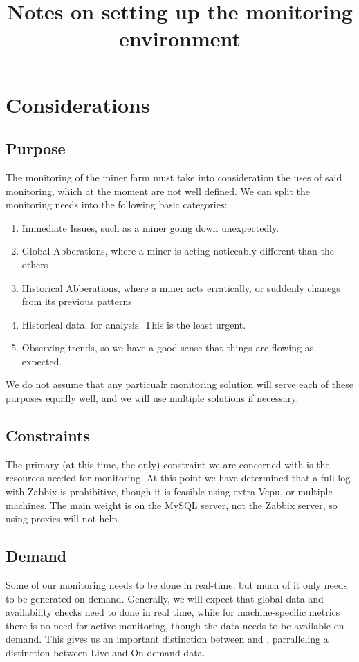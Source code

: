 \title{Notes on setting up the monitoring environment}
\section{Considerations}
\subsection{Purpose}
The monitoring of the miner farm must take into consideration the uses of said monitoring, which at the moment are not well defined. We can split the monitoring needs into the following basic categories:
\begin{enumerate}
	\item{Immediate Issues, such as a miner going down unexpectedly.}
	\item{Global Abberations, where a miner is acting noticeably different than the others}
	\item{Historical Abberations, where a miner acts erratically, or suddenly chanegs from its previous patterns}
	\item{Historical data, for analysis. This is the least urgent.}
	\item{Observing trends, so we have a good sense that things are flowing as expected.}
\end{enumerate}

We  do not assume that any particualr monitoring solution will serve each of these purposes equally well, and we will use multiple solutions if necessary.

\subsection{Constraints}
The primary (at this time, the only) constraint we are concerned with is the resources needed for monitoring.
At this point we have determined that a full log with Zabbix is prohibitive, though it is feasible using extra Vcpu, or multiple machines. The main weight is on the MySQL server, not the Zabbix server, so using proxies will not help.

\subsection{Demand}
Some of our monitoring needs to be done in real-time, but much of it only needs to be generated on demand. 
Generally, we will expect that global data and availability checks need to done in real time, while for machine-specific metrics there is no need for active monitoring, though the data needs to be available on demand. This gives us an important distinction between  and , parralleling a distinction between {\textem Live} and {\textem On-demand} data.

